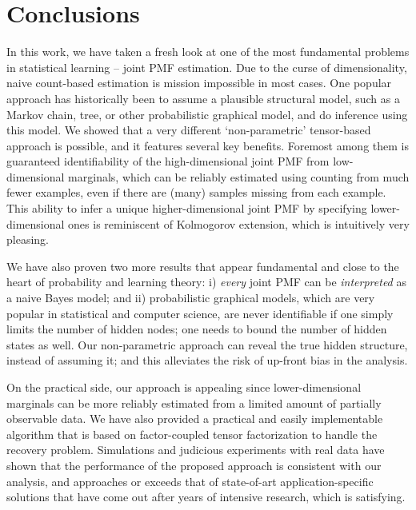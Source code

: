 \documentclass[journal]{IEEEtran}
\begin{document}
\section{Conclusions}
\label{sec:conclusion}

In this work, we have taken a fresh look at one of the most fundamental problems in statistical learning -- joint PMF estimation. Due to the curse of dimensionality, naive count-based estimation is mission impossible in most cases. One popular approach has historically been to assume a plausible structural model, such as a Markov chain, tree, or other probabilistic graphical model, and do inference using this model. We showed that a very different `non-parametric' tensor-based approach is possible, and it features several key benefits. Foremost among them is guaranteed identifiability of the  {high-dimensional} joint PMF from  {low-dimensional marginals}, which can be reliably estimated using counting from much fewer examples, even if there are (many) samples missing from each example. This ability to infer a unique  {higher-dimensional} joint PMF by specifying  {lower-dimensional} ones is reminiscent of Kolmogorov extension, which is intuitively very pleasing. 

We have also proven two more results that appear fundamental and close to the heart of probability and learning theory: i) {\em every} joint PMF can be {\em interpreted} as a naive Bayes model; and ii) probabilistic graphical models, which are very popular in statistical and computer science, are never identifiable if one simply limits the number of hidden nodes; one needs to bound the number of hidden states as well. 
Our non-parametric approach can reveal the true hidden structure, instead of assuming it; and this alleviates the risk of up-front bias in the analysis. 

On the practical side, our approach is appealing since  {lower-dimensional} marginals can be more reliably estimated from a limited amount of partially observable data. We have also provided a practical and easily implementable algorithm that is based  on factor-coupled tensor factorization to handle the recovery problem. Simulations and judicious experiments with real data have shown that the performance of the proposed approach is consistent with our analysis, and approaches or exceeds that of state-of-art application-specific solutions that have come out after years of intensive research, which is satisfying. 
\end{document}
